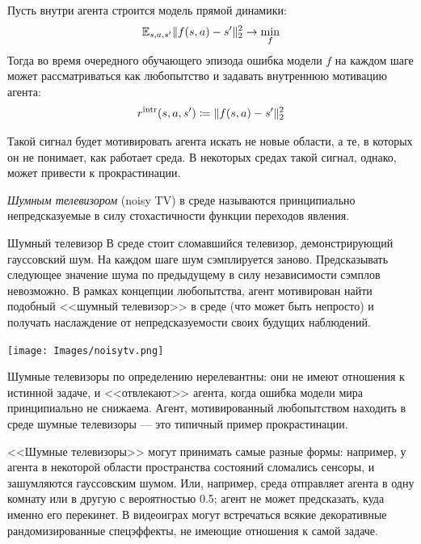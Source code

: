Пусть внутри агента строится модель прямой динамики:
$$\mathbb{E}_{s,a,s'} \|f(s, a) - s'\|^2_2 \to \min_f$$
Тогда во время очередного обучающего эпизода ошибка модели $f$ на каждом шаге может рассматриваться как любопытство и задавать внутреннюю мотивацию агента:
\begin{equation}\label{curiosity}
r^{\mathrm{intr}}(s, a, s') \coloneqq \|f(s, a) - s'\|^2_2
\end{equation}

Такой сигнал будет мотивировать агента искать не новые области, а те, в которых он не понимает, как работает среда. В некоторых средах такой сигнал, однако, может привести к прокрастинации.

\begin{definition}
\emph{Шумным телевизором} (noisy TV) в среде называются принципиально непредсказуемые в силу стохастичности функции переходов явления.
\end{definition}

\begin{exampleBox}[righthand ratio=0.2, sidebyside, sidebyside align=center, lower separated=false]{Шумный телевизор}
В среде стоит сломавшийся телевизор, демонстрирующий гауссовский шум. На каждом шаге шум сэмплируется заново. Предсказывать следующее значение шума по предыдущему в силу независимости сэмплов невозможно. В рамках концепции любопытства, агент мотивирован найти подобный <<шумный телевизор>> в среде (что может быть непросто) и получать наслаждение от непредсказуемости своих будущих наблюдений.

\tcblower
\texttt{[image: Images/noisytv.png]}
\end{exampleBox}

Шумные телевизоры по определению нерелевантны: они не имеют отношения к истинной задаче, и <<отвлекают>> агента, когда ошибка модели мира принципиально не снижаема. Агент, мотивированный любопытством находить в среде шумные телевизоры --- это типичный пример прокрастинации.

\begin{example}
<<Шумные телевизоры>> могут принимать самые разные формы: например, у агента в некоторой области пространства состояний сломались сенсоры, и зашумляются гауссовским шумом. Или, например, среда отправляет агента в одну комнату или в другую с вероятностью 0.5; агент не может предсказать, куда именно его перекинет. В видеоиграх могут встречаться всякие декоративные рандомизированные спецэффекты, не имеющие отношения к самой задаче.
\end{example}

